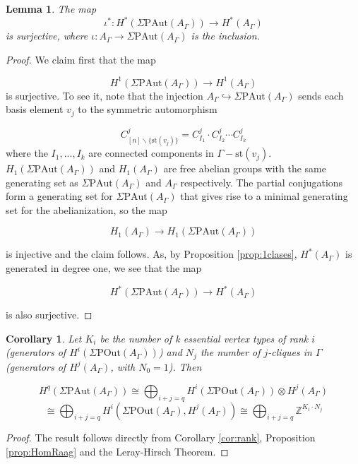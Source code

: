 \documentclass[a4paper]{amsart}
\newcommand{\G}{\Gamma}
\newcommand{\A}{{A_\Gamma}}
\newcommand{\PAut}{\Sigma\mathrm{PAut}}
\newcommand{\POut}{\Sigma\mathrm{POut}}
\newtheorem{cor}[teo]{Corollary}
\newtheorem{lem}[teo]{Lemma}
\theoremstyle{definition}
\theoremstyle{remark}
\begin{document}
\begin{lem}
The map 
$$
\iota^*: H^*(\PAut(A_\G)) \rightarrow H^*( A_\G)
$$
is surjective, where $\iota:  A_\G\rightarrow  \PAut(A_\G)$ is the inclusion. \label{lem:tecnic}


\end{lem} 



\begin{proof}
    We claim first that the map
    
        
        $$
H^1(\PAut(A_\G)) \rightarrow H^1(\A)
$$
is surjective. To see it, note that the injection $A_\G \hookrightarrow \PAut(A_\G)$ sends  each basis element $v_j$  to the symmetric automorphism

$$
C_{[n] \backslash\{\mathrm{st}(v_j)\}}^j=C_{I_1}^j \cdot C_{I_2}^j\cdots C_{I_k}^j
$$
where the $I_1,...,I_k$ are connected components in $\G-\mathrm{st}(v_j)$.  $H_1\left(\PAut(A_\G)\right)$ and $H_1\left(\A\right)$  are  free abelian groups with the same generating set  as   $\PAut(A_\G)$ and $A_\G$  respectively. The partial conjugations form a generating set for $\PAut(A_\G)$ that gives rise to a minimal generating set for the abelianization, so the map

$$
H_1\left(\A\right) \rightarrow H_1\left(\PAut(A_\G)\right) 
$$

\noindent is injective and the claim follows. As, by Proposition \ref{prop:1clases}, $H^*(\A)$ is generated in degree one, we see that the map

$$
H^*(\PAut(A_\G)) \rightarrow H^*(\A)
$$

\noindent is also surjective. 


 
\end{proof} 


\begin{cor} Let $K_i$ be the number of k essential vertex types of rank $i$ (generators of $H^i(\POut(A_\G) )$) and   $N_j$  the number of $j$-cliques in $\G$  (generators of $H^j(\A)$, with $N_0=1$).  Then

 $$
 H^q(\PAut(A_\G))\cong \bigoplus_{i+j=q} H^i(\POut(A_\G)) \otimes H^j(\A) 
 $$ 
 $$
\cong \bigoplus_{i+j=q} H^i(\POut(A_\G),H^j(A_\G)  ) \cong \bigoplus_{i+j=q} \mathbb{Z}^{K_i\cdot N_j}
$$

\end{cor}
\begin{proof}
    The result follows directly from    Corollary \ref{cor:rank}, Proposition \ref{prop:HomRaag} and the Leray-Hirsch Theorem. 
\end{proof}
\end{document}
